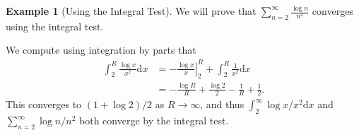 \documentclass[11pt, a4paper]{article}
\theoremstyle{definition}
\newtheorem{example}[theorem]{Example}
\newcommand{\dd}{\mathrm{d}}
\begin{document}
\begin{example}[Using the Integral Test]
	We will prove that $\sum_{n = 2}^{\infty} \frac{\log n}{n^2}$ converges using the integral test.

	We compute using integration by parts that
	\begin{align*}
		\int_2^R \frac{\log x}{x^2} \dd x &= -\left.\frac{\log x}{x} \right|_2^R + \int_2^R \frac{1}{x^2} \dd x \\
		&= - \frac{\log R}{R} + \frac{\log 2}{2} - \frac{1}{R} + \frac{1}{2}.
	\end{align*}
	This converges to $(1 + \log 2)/2$ as $R \rightarrow \infty$, and thus $\int_2^{\infty} \log x/x^2 \dd x$ and $\sum_{n = 2}^{\infty} \log n/n^2$ both converge by the integral test.
\end{example}
\end{document}
